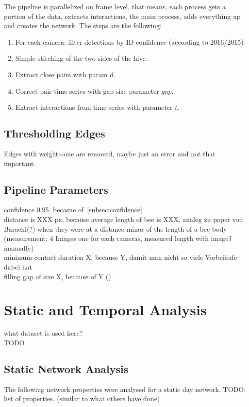 The pipeline is parallelized on frame level, that means, each process gets a portion of the data, extracts interactions, the main process, adds everything up and creates the network. The steps are the following:

\begin{enumerate}
\item For each camera: filter detections by ID confidence (according to 2016/2015)
\item Simple stitching of the two sides of the hive.
\item Extract close pairs with param $d$.
\item Correct pair time series with gap size parameter $gap$.
\item Extract interactions from time series with parameter $t$.
\end{enumerate}


\subsection{Thresholding Edges}
Edges with weight=one are removed, maybe just an error and not that important.

\subsection{Pipeline Parameters}
confidence 0.95, becasue of~\ref{subsec:confidence}\\

distance is XXX px, because average length of bee is XXX, analog zu paper von Barachi(?) when they were at a distance minor of the length of a bee body~\cite{baracchi2014socio} (measurement: 4 Images one for each cameras, measured length with imageJ manually)\\

minimum contact duration X, because Y, damit man nicht so viele Vorbeiäufe dabei hat\\
filling gap of size X, because of Y ()\\

\section{Static and Temporal Analysis}
what dataset is used here?\\
TODO\\

\subsection{Static Network Analysis}
The following network properties were analysed for a static day network.
TODO: list of properties. (similar to what others have done)

